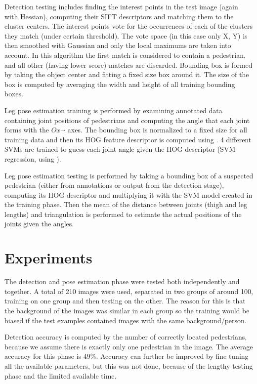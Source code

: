 \documentclass[a4paper]{article}
\begin{document}
Detection testing includes finding the interest points in the test image (again
with Hessian), computing their SIFT descriptors and matching them to the
cluster centers. The interest points vote for the occurrences of each of the
clusters they match (under certain threshold). The vote space (in this case
only X, Y) is then smoothed with Gaussian and only the local maximums are taken
into account. In this algorithm the first match is considered to contain
a pedestrian, and all other (having lower score) matches are discarded.
Bounding box is formed by taking the object center and fitting a fixed size box
around it. The size of the box is computed by averaging the width and height of
all training bounding boxes.

Leg pose estimation training is performed by examining annotated data
containing joint positions of pedestrians and computing the angle that each
joint forms with the $ Ox\vec{} $ axes. The bounding box is normalized to
a fixed size for all training data and then its HOG feature descriptor is
computed using \cite{hogImp}. 4 different SVMs are trained to guess each joint
angle given the HOG descriptor (SVM regression, using \cite{svmToolkit}).

Leg pose estimation testing is performed by taking a bounding box of
a suspected pedestrian (either from annotations or output from the detection
stage), computing its HOG descriptor and multiplying it with the SVM model
created in the training phase. Then the mean of the distance between joints
(thigh and leg lengths) and triangulation is performed to estimate the actual
positions of the joints given the angles.

\section{Experiments}
The detection and pose estimation phase were tested both independently and
together. A total of 210 images were used, separated in two groups of around
100, training on one group and then testing on the other. The reason for this
is that the background of the images was similar in each group so the training
would be biased if the test examples contained images with the same
background/person.

Detection accuracy is computed by the number of correctly located pedestrians,
because we assume there is exactly only one pedestrian in the image. The
average accuracy for this phase is 49\%. Accuracy can further be improved by
fine tuning all the available parameters, but this was not done, because of the
lengthy testing phase and the limited available time.
 
\end{document}
